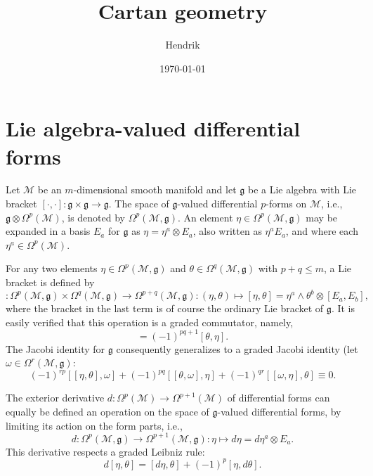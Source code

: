 \documentclass[11pt]{article}
\title{Cartan geometry}
\author{Hendrik}
\date{\today}
\begin{document}
\maketitle

\section{Lie algebra-valued differential forms}
\label{app:Lie_val_forms}

Let $\mathcal{M}$ be an $m$-dimensional smooth manifold and let 
$\mathfrak{g}$ be a Lie algebra with Lie bracket $[\cdot,\cdot] : 
\mathfrak{g} \times \mathfrak{g} \to \mathfrak{g}$. The space of 
$\mathfrak{g}$-valued differential $p$-forms on $\mathcal{M}$, 
i.e.,~$\mathfrak{g} \otimes \Omega^p(\mathcal{M})$, is denoted by 
$\Omega^p(\mathcal{M},\mathfrak{g})$. An element $\eta \in 
\Omega^p(\mathcal{M},\mathfrak{g})$ may be expanded in a basis 
$E_a$ for $\mathfrak{g}$ as $\eta = \eta^a \otimes E_a$, also 
written as $\eta^a E_a$, and where each $\eta^a \in 
\Omega^p(\mathcal{M})$. 

For any two elements $\eta \in \Omega^p(\mathcal{M},\mathfrak{g})$ and 
$\theta \in \Omega^q(\mathcal{M},\mathfrak{g})$ with $p + q \leq m$, a Lie 
bracket is defined by
\begin{displaymath}
	[.,.] : \Omega^p(\mathcal{M},\mathfrak{g}) \times 
	\Omega^q(\mathcal{M},\mathfrak{g}) \to \Omega^{p+q}(\mathcal{M},\mathfrak{g})
	: (\eta,\theta) \mapsto [\eta,\theta] = \eta^a \wedge \theta^b 
	\otimes [E_a,E_b],
\end{displaymath}
where the bracket in the last term is of course the ordinary Lie 
bracket of $\mathfrak{g}$. It is easily verified that this 
operation is a graded commutator, namely,
\begin{displaymath}
	[\eta,\theta] = (-1)^{pq + 1} [\theta,\eta].
\end{displaymath}
The Jacobi identity for $\mathfrak{g}$ consequently generalizes 
to a graded Jacobi identity (let $\omega \in 
\Omega^r(\mathcal{M},\mathfrak{g})$:
\begin{displaymath}
	(-1)^{rp}[[\eta,\theta],\omega] + 
	(-1)^{pq}[[\theta,\omega],\eta] +
	(-1)^{qr}[[\omega,\eta],\theta] \equiv 0.
\end{displaymath}

The exterior derivative $d : \Omega^p(\mathcal{M}) \to 
\Omega^{p+1}(\mathcal{M})$ of differential forms can equally be 
defined an operation on the space of $\mathfrak{g}$-valued 
differential forms, by limiting its action on the form parts, 
i.e.,
\begin{displaymath}
	d : \Omega^p(\mathcal{M},\mathfrak{g}) \to \Omega^{p+1}(\mathcal{M},\mathfrak{g})
	: \eta \mapsto d\eta = d\eta^a \otimes E_a.
\end{displaymath}
This derivative respects a graded Leibniz rule:
\begin{displaymath}
	d[\eta,\theta] = [d\eta,\theta] + (-1)^p [\eta,d\theta].
\end{displaymath}
\end{document}
